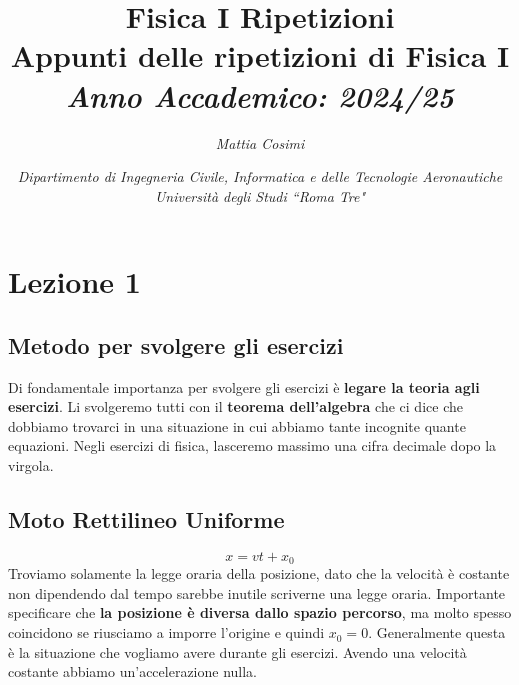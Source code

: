 \documentclass{article}
\numberwithin{equation}{subsection}
\begin{document}
\title{%
    \textbf{Fisica I Ripetizioni}  \\ 
    \large Appunti delle ripetizioni di Fisica I\\
    \textit{Anno Accademico: 2024/25}}
\author{\textit{Mattia Cosimi}}
\date{\textit{Dipartimento di Ingegneria Civile, Informatica e delle Tecnologie Aeronautiche \\
Università degli Studi ``Roma Tre"}}

\maketitle


\clearpage

\pagestyle{fancy}
\fancyhead{}\fancyfoot{}
\fancyfoot[C]{\thepage}

\tableofcontents

\clearpage


\section{Lezione 1}
\subsection{Metodo per svolgere gli esercizi}
Di fondamentale importanza per svolgere gli esercizi è \textbf{legare la teoria agli esercizi}. Li svolgeremo tutti con il \textbf{teorema dell'algebra} che ci dice che dobbiamo trovarci in una situazione in cui abbiamo tante incognite quante equazioni. Negli esercizi di fisica, lasceremo massimo una cifra decimale dopo la virgola.
\subsection{Moto Rettilineo Uniforme}
\begin{equation}
    x=vt+x_0
\end{equation}
Troviamo solamente la legge oraria della posizione, dato che la velocità è costante non dipendendo dal tempo sarebbe inutile scriverne una legge oraria. Importante specificare che \textbf{la posizione è diversa dallo spazio percorso}, ma molto spesso coincidono se riusciamo a imporre l'origine e quindi $x_0=0$. Generalmente questa è la situazione che vogliamo avere durante gli esercizi. Avendo una velocità costante abbiamo un'accelerazione nulla.
\end{document}
